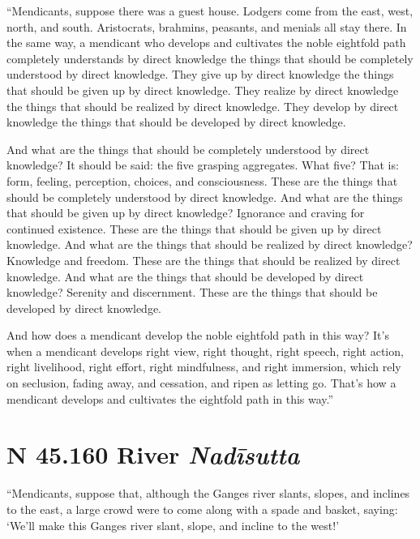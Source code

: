 \documentclass[12pt,openany]{book}%
\newcommand*{\suttatitleacronym}[1]{\smaller[2]{#1}\vspace*{.3em}}
\newcommand*{\suttatitletranslation}[1]{\linebreak{#1}}
\newcommand*{\suttatitleroot}[1]{\linebreak\smaller[2]\itshape{#1}}
\newcommand*{\tocacronym}[1]{\hspace*{-3.3em}{#1}\quad}
\newcommand*{\toctranslation}[1]{#1}
\newcommand*{\tocroot}[1]{(\textit{#1})}
\begin{document}
“Mendicants, suppose there was a guest house. Lodgers come from the east, west, north, and south. Aristocrats, brahmins, peasants, and menials all stay there. In the same way, a mendicant who develops and cultivates the noble eightfold path completely understands by direct knowledge the things that should be completely understood by direct knowledge. They give up by direct knowledge the things that should be given up by direct knowledge. They realize by direct knowledge the things that should be realized by direct knowledge. They develop by direct knowledge the things that should be developed by direct knowledge. 

And what are the things that should be completely understood by direct knowledge? It should be said: the five grasping aggregates. What five? That is: form, feeling, perception, choices, and consciousness. These are the things that should be completely understood by direct knowledge. And what are the things that should be given up by direct knowledge? Ignorance and craving for continued existence. These are the things that should be given up by direct knowledge. And what are the things that should be realized by direct knowledge? Knowledge and freedom. These are the things that should be realized by direct knowledge. And what are the things that should be developed by direct knowledge? Serenity and discernment. These are the things that should be developed by direct knowledge. 

And how does a mendicant develop the noble eightfold path in this way? It’s when a mendicant develops right view, right thought, right speech, right action, right livelihood, right effort, right mindfulness, and right immersion, which rely on seclusion, fading away, and cessation, and ripen as letting go. That’s how a mendicant develops and cultivates the eightfold path in this way.” 

%
\section*{{\suttatitleacronym SN 45.160}{\suttatitletranslation A River }{\suttatitleroot Nadīsutta}}
\addcontentsline{toc}{section}{\tocacronym{SN 45.160} \toctranslation{A River } \tocroot{Nadīsutta}}

“Mendicants, suppose that, although the Ganges river slants, slopes, and inclines to the east, a large crowd were to come along with a spade and basket, saying: ‘We’ll make this Ganges river slant, slope, and incline to the west!’ 
\end{document}
